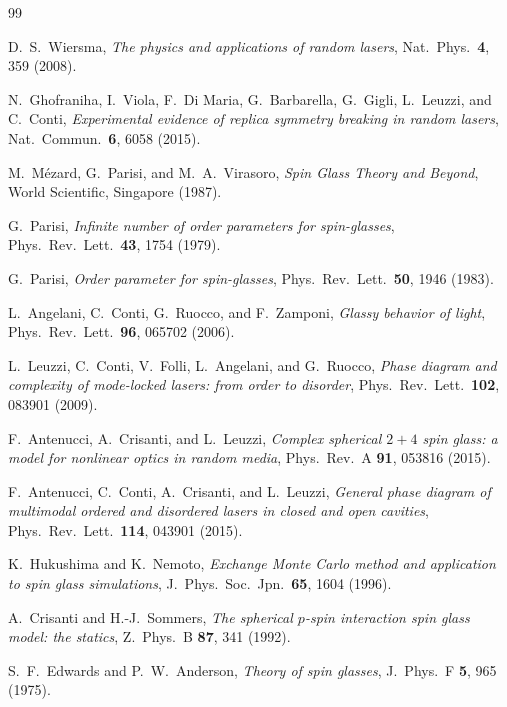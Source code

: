 \documentclass[11pt,a4paper]{article}
\begin{document}
\begin{thebibliography}{99}

D.~S.~Wiersma,
\emph{The physics and applications of random lasers},
Nat.\ Phys.\ \textbf{4}, 359 (2008).

N.~Ghofraniha, I.~Viola, F.~Di Maria, G.~Barbarella, G.~Gigli,
L.~Leuzzi, and C.~Conti,
\emph{Experimental evidence of replica symmetry breaking
in random lasers},
Nat.\ Commun.\ \textbf{6}, 6058 (2015).

M.~M\'ezard, G.~Parisi, and M.~A.~Virasoro,
\emph{Spin Glass Theory and Beyond},
World Scientific, Singapore (1987).

G.~Parisi,
\emph{Infinite number of order parameters for spin-glasses},
Phys.\ Rev.\ Lett.\ \textbf{43}, 1754 (1979).

G.~Parisi,
\emph{Order parameter for spin-glasses},
Phys.\ Rev.\ Lett.\ \textbf{50}, 1946 (1983).

L.~Angelani, C.~Conti, G.~Ruocco, and F.~Zamponi,
\emph{Glassy behavior of light},
Phys.\ Rev.\ Lett.\ \textbf{96}, 065702 (2006).

L.~Leuzzi, C.~Conti, V.~Folli, L.~Angelani, and G.~Ruocco,
\emph{Phase diagram and complexity of mode-locked lasers:
from order to disorder},
Phys.\ Rev.\ Lett.\ \textbf{102}, 083901 (2009).

F.~Antenucci, A.~Crisanti, and L.~Leuzzi,
\emph{Complex spherical $2+4$ spin glass: a model for nonlinear
optics in random media},
Phys.\ Rev.\ A \textbf{91}, 053816 (2015).

F.~Antenucci, C.~Conti, A.~Crisanti, and L.~Leuzzi,
\emph{General phase diagram of multimodal ordered and
disordered lasers in closed and open cavities},
Phys.\ Rev.\ Lett.\ \textbf{114}, 043901 (2015).

K.~Hukushima and K.~Nemoto,
\emph{Exchange Monte Carlo method and application to spin
glass simulations},
J.\ Phys.\ Soc.\ Jpn.\ \textbf{65}, 1604 (1996).

A.~Crisanti and H.-J.~Sommers,
\emph{The spherical $p$-spin interaction spin glass model:
the statics},
Z.\ Phys.\ B \textbf{87}, 341 (1992).

S.~F.~Edwards and P.~W.~Anderson,
\emph{Theory of spin glasses},
J.\ Phys.\ F \textbf{5}, 965 (1975).


\end{thebibliography}
\end{document}
